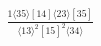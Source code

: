 \documentclass[varwidth, border=5pt]{standalone}
\begin{document}
\begin{my}
$\begin{gathered}
\scriptscriptstyle\frac{1⟨35⟩[14]⟨23⟩[35]}{⟨13⟩^2[15]^2⟨34⟩}
\end{gathered}$
\end{my}
\end{document}
